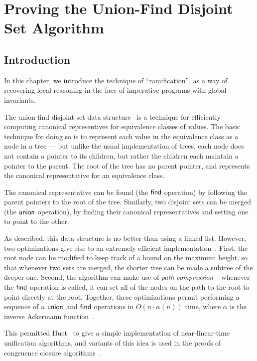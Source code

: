 \chapter{Proving the Union-Find Disjoint Set Algorithm}

\section{Introduction}

In this chapter, we introduce the technique of ``ramification'', as a
way of recovering local reasoning in the face of imperative programs
with global invariants.

The union-find disjoint set data structure~\cite{union-find} is a
technique for efficiently computing canonical representives for
equivalence classes of values. The basic technique for doing so is to
represent each value in the equivalence class as a node in a tree ---
but unlike the usual implementation of trees, each node does not
contain a pointer to its children, but rather the children each
maintain a pointer to the parent. The root of the tree has no parent
pointer, and represents the canonical representative for an
equivalence class.

The canonical representative can be found (the $\mathsf{find}$ operation) by
following the parent pointers to the root of the tree. Similarly, two
disjoint sets can be merged (the $\mathsf{union}$ operation), by finding their
canonical representatives and setting one to point to the other.

As described, this data structure is no better than using a linked
list. However, two optimizations give rise to an extremely efficient
implementation~\cite{galler-fischer-union-find}. First, the root node
can be modified to keep track of a bound on the maximum height, so
that whenever two sets are merged, the shorter tree can be made a
subtree of the deeper one. Second, the algorithm can make use of
\emph{path compression} -- whenever the $\mathsf{find}$ operation is called,
it can set all of the nodes on the path to the root to point directly
at the root. Together, these optimizations permit performing a
sequence of $n$ $\mathsf{union}$ and $\mathsf{find}$ operations in $O(n \cdot
\alpha(n))$ time, where $\alpha$ is the inverse Ackermann
function~\cite{tarjan-union-find-bound}.

This permitted Huet~\cite{huet-unification} to give a simple
implementation of near-linear-time unification algorithms, and
variants of this idea is used in the proofs of congruence closure
algorithms~\cite{congruence-closure}.

